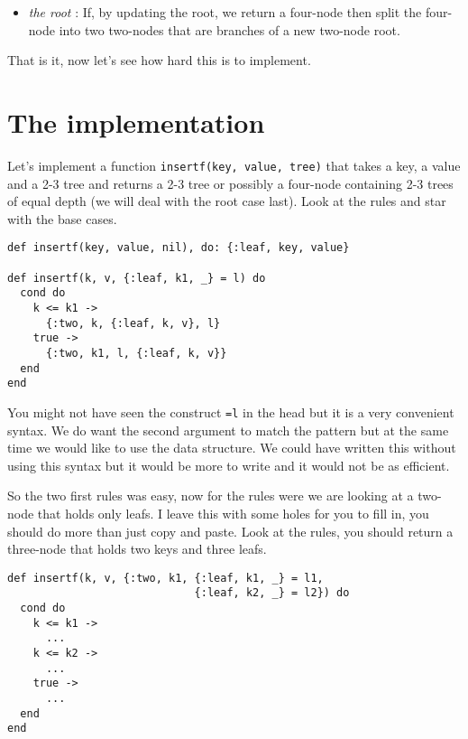 \documentclass[a4paper,11pt]{article}
\begin{document}
\begin{itemize}
    \item {\em the root} : If, by updating the root, we return a four-node
    then split the four-node into two two-nodes that are branches of a
    new two-node root.
\end{itemize}

That is it, now let's see how hard this is to implement.



\section{The implementation}

Let's implement a function {\tt insertf(key, value, tree)} that takes a
key, a value and a 2-3 tree and returns a 2-3 tree or possibly a
four-node containing 2-3 trees of equal depth (we will deal with the
root case last). Look at the rules and star with the base cases.

\begin{verbatim}
def insertf(key, value, nil), do: {:leaf, key, value}

def insertf(k, v, {:leaf, k1, _} = l) do
  cond do
    k <= k1 ->
      {:two, k, {:leaf, k, v}, l}
    true ->
      {:two, k1, l, {:leaf, k, v}}
  end
end
\end{verbatim}

You might not have seen the construct {\tt =l} in the head but it is a
very convenient syntax. We do want the second argument to match the
pattern but at the same time we would like to use the data
structure. We could have written this without using this syntax but it
would be more to write and it would not be as efficient.

So the two first rules was easy, now for the rules were we are looking
at a two-node that holds only leafs. I leave this with some holes for
you to fill in, you should do more than just copy and paste. Look at
the rules, you should return a three-node that holds two keys and
three leafs.

\begin{verbatim}
def insertf(k, v, {:two, k1, {:leaf, k1, _} = l1, 
                             {:leaf, k2, _} = l2}) do
  cond do
    k <= k1 ->
      ...
    k <= k2 ->
      ...
    true ->
      ...
  end
end
\end{verbatim}
\end{document}
